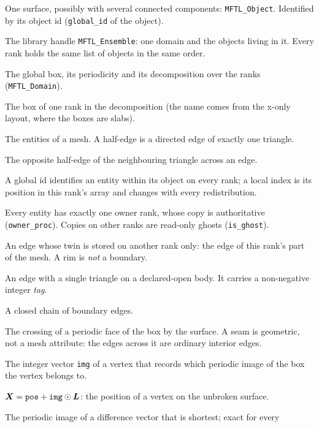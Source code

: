 \begin{description}[style=nextline,leftmargin=2.5em]
\item[object (body)] One surface, possibly with several connected components:
  \texttt{MFTL\_Object}. Identified by its object id (\texttt{global\_id} of the object).
\item[ensemble] The library handle \texttt{MFTL\_Ensemble}: one domain and the objects living
  in it. Every rank holds the same list of objects in the same order.
\item[domain] The global box, its periodicity and its decomposition over the ranks
  (\texttt{MFTL\_Domain}).
\item[slab] The box of one rank in the decomposition (the name comes from the x-only layout,
  where the boxes are slabs).
\item[vertex, triangle, half-edge] The entities of a mesh. A half-edge is a directed edge of
  exactly one triangle.
\item[twin] The opposite half-edge of the neighbouring triangle across an edge.
\item[global id / local index] A global id identifies an entity within its object on every
  rank; a local index is its position in this rank's array and changes with every
  redistribution.
\item[owner, ghost] Every entity has exactly one owner rank, whose copy is authoritative
  (\texttt{owner\_proc}). Copies on other ranks are read-only ghosts (\texttt{is\_ghost}).
\item[rim (MPI rim)] An edge whose twin is stored on another rank only: the edge of this
  rank's part of the mesh. A rim is \emph{not} a boundary.
\item[physical boundary] An edge with a single triangle on a declared-open body. It carries a
  non-negative integer \emph{tag}.
\item[boundary loop] A closed chain of boundary edges.
\item[seam] The crossing of a periodic face of the box by the surface. A seam is geometric, not a
  mesh attribute: the edges across it are ordinary interior edges.
\item[image counter] The integer vector \texttt{img} of a vertex that records which periodic
  image of the box the vertex belongs to.
\item[continuous coordinate] $\boldsymbol{X}=\texttt{pos}+\texttt{img}\odot\boldsymbol{L}$: the position of a
  vertex on the unbroken surface.
\item[minimum image] The periodic image of a difference vector that is shortest; exact for every

\end{description}
